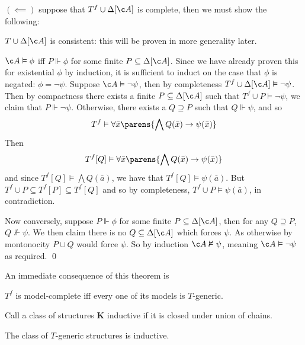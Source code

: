$(\impliedby)$ suppose that $T^f\cup\Delta[\c A]$ is complete, then we must show the following:
\benum
    \item $T\cup\Delta[\c A]$ is consistent: this will be proven in more generality later.
    \item $\c A\vDash\phi$ iff $P\Vdash\phi$ for some finite $P\subseteq\Delta[\c A]$.
    Since we have already proven this for existential $\phi$ by induction, it is sufficient to induct on the case that $\phi$ is negated: $\phi=\neg\psi$.
    Suppose $\c A\vDash\neg\psi$, then by completeness $T^f\cup\Delta[\c A]\vDash\neg\psi$.
    Then by compactness there exists a finite $P\subseteq\Delta[\c A]$ such that $T^f\cup P\vDash\neg\psi$, we claim that $P\Vdash\neg\psi$.
    Otherwise, there exists a $Q\supseteq P$ such that $Q\Vdash\psi$, and so
    $$ T^f\vDash\forall\bar x\parens{\bigwedge Q(\bar x)\to\psi(\bar x)} $$
    Then
    $$ T^f[Q]\vDash\forall\bar x\parens{\bigwedge Q(\bar x)\to\psi(\bar x)} $$
    and since $T^f[Q]\vDash\bigwedge Q(\bar a)$, we have that $T^f[Q]\vDash\psi(\bar a)$.
    But $T^f\cup P\subseteq T^f[P]\subseteq T^f[Q]$ and so by completeness, $T^f\cup P\vDash\psi(\bar a)$, in contradiction.

    Now conversely, suppose $P\Vdash\phi$ for some finite $P\subseteq\Delta[\c A]$, then for any $Q\supseteq P$, $Q\nVdash\psi$.
    We then claim there is no $Q\subseteq\Delta[\c A]$ which forces $\psi$.
    As otherwise by montonocity $P\cup Q$ would force $\psi$.
    So by induction $\c A\nvDash\psi$, meaning $\c A\vDash\neg\psi$ as required.
    \qed
\eenum

An immediate consequence of this theorem is

\bcoro[name=coro5.1]

    $T^f$ is model-complete iff every one of its models is $T$-generic.

\ecoro

\bdefn

    Call a class of structures $\boldsymbol K$ {\emphcolor inductive} if it is closed under union of chains.

\edefn

\bthrm

    The class of $T$-generic structures is inductive.

\ethrm

